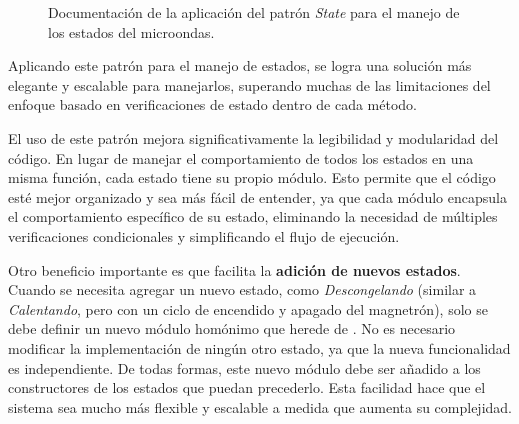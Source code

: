 \begin{figure}
\caption{Documentación de la aplicación del patrón \textit{State} para el manejo de los estados del microondas.}
\label{docState}
\end{figure}


Aplicando este patrón para el manejo de estados, se logra una solución más elegante y escalable para manejarlos, superando muchas de las limitaciones del enfoque basado en verificaciones de estado dentro de cada método.


El uso de este patrón mejora significativamente la legibilidad y modularidad del código. En lugar de manejar el comportamiento de todos los estados en una misma función, cada estado tiene su propio módulo. Esto permite que el código esté mejor organizado y sea más fácil de entender, ya que cada módulo encapsula el comportamiento específico de su estado, eliminando la necesidad de múltiples verificaciones condicionales y simplificando el flujo de ejecución.

Otro beneficio importante es que facilita la \textbf{adición de nuevos estados}. Cuando se necesita agregar un nuevo estado, como \textit{Descongelando} (similar a \textit{Calentando}, pero con un ciclo de encendido y apagado del magnetrón), solo se debe definir un nuevo módulo homónimo que herede de \EstadoMicroondas. No es necesario modificar la implementación de ningún otro estado, ya que la nueva funcionalidad es independiente. De todas formas, este nuevo módulo debe ser añadido a los constructores de los estados que puedan precederlo. Esta facilidad hace que el sistema sea mucho más flexible y escalable a medida que aumenta su complejidad.

